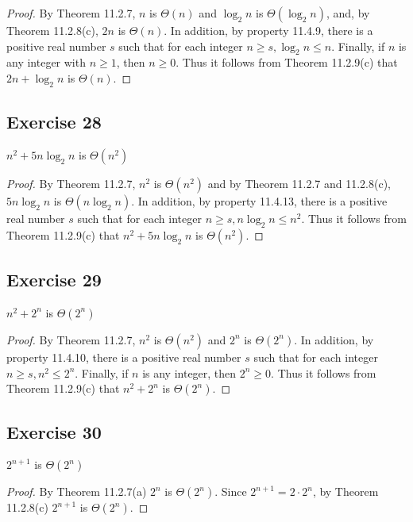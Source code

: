 \documentclass[14pt]{extarticle}
\begin{document}
\begin{proof}
By Theorem 11.2.7, \(n\) is \(\Theta(n)\) and \(\log_2 n\) is \(\Theta(\log_2 n)\), and, by Theorem 11.2.8(c), \(2n\) is 
\(\Theta(n)\). In addition, by property 11.4.9, there is a positive real number \(s\) such that for each integer 
\(n \geq s, \log_2 n \leq n\). Finally, if \(n\) is any integer with \(n \geq 1\), then \(n \geq 0\). Thus it follows 
from Theorem 11.2.9(c) that \(2n + \log_2 n\) is \(\Theta(n)\).
\end{proof}

\subsection{Exercise 28}
\(n^2 + 5n\log_2 n\) is \(\Theta(n^2)\)

\begin{proof}
By Theorem 11.2.7, \(n^2\) is \(\Theta(n^2)\) and by Theorem 11.2.7 and 11.2.8(c), \(5n\log_2 n\) is \(\Theta(n\log_2 n)\). 
In addition, by property 11.4.13, there is a positive real number \(s\) such that for each integer \(n \geq s, n \log_2 n 
\leq n^2\). Thus it follows from Theorem 11.2.9(c) that \(n^2 + 5n \log_2 n\) is \(\Theta(n^2)\).
\end{proof}

\subsection{Exercise 29}
\(n^2 + 2^n\) is \(\Theta(2^n)\)

\begin{proof}
By Theorem 11.2.7, \(n^2\) is \(\Theta(n^2)\) and \(2^n\) is \(\Theta(2^n)\). In addition, by property 11.4.10, there is a 
positive real number \(s\) such that for each integer \(n \geq s, n^2 \leq 2^n\). Finally, if \(n\) is any integer, then 
\(2^n \geq 0\). Thus it follows from Theorem 11.2.9(c) that \(n^2 + 2^n\) is \(\Theta(2^n)\).
\end{proof}

\subsection{Exercise 30}
\(2^{n+1}\) is \(\Theta(2^n)\)

\begin{proof}
By Theorem 11.2.7(a) \(2^n\) is \(\Theta(2^n)\). Since \(2^{n+1} = 2 \cdot 2^n\), by Theorem 11.2.8(c) \(2^{n+1}\) is
\(\Theta(2^n)\).
\end{proof}
\end{document}
